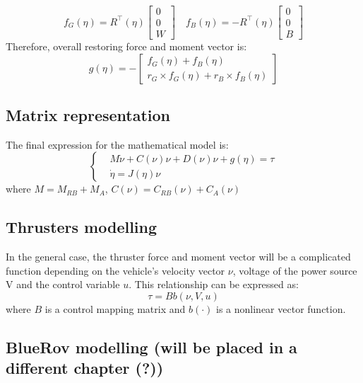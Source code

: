 $$
f_G\left(\eta\right)=R^{\top}\left(\eta\right)\left[\begin{array}{l}
0 \\
0 \\
W
\end{array}\right] \quad f_B\left(\eta\right)=-R^{\top}\left(\eta\right)\left[\begin{array}{l}
0 \\
0 \\
B
\end{array}\right]
$$
Therefore, overall restoring force and moment vector is:
$$
g(\eta)=-\left[\begin{array}{c}
f_G(\eta)+f_B(\eta) \\
r_G \times f_G(\eta)+r_B \times f_B(\eta)
\end{array}\right]
$$

\subsection{Matrix representation}

The final expression for the mathematical model is:
$$
\begin{cases}
& M \dot{\nu}+C(\nu) \nu+D(\nu) \nu+g(\eta)=\tau \\
& \dot{\eta}=J(\eta) \nu
\end{cases}
$$
where
$M=M_{R B}+M_A$, $C(\nu)=C_{R B}(\nu)+C_A(\nu)$

\subsection{Thrusters modelling}

In the general case, the thruster force and moment vector will be 
a complicated function depending on the vehicle's velocity vector $\nu$, 
voltage of the power source V 
and the control variable $u$.
This relationship can be expressed as:
$$
\tau=Bb(\nu, V, u)
$$
where $B$ is a control mapping matrix and
$b(\cdot)$ is a nonlinear vector function.

\subsection{BlueRov modelling (will be placed in a different chapter (?))}

